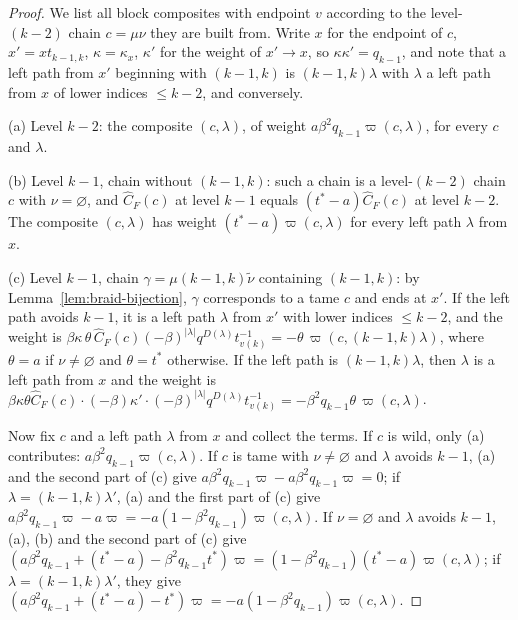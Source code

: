 \documentclass[11pt]{article}
\begin{document}
\begin{proof}
We list all block composites with endpoint $v$ according to the
level-$(k-2)$ chain $c=\mu\nu$ they are built from. Write $x$ for the
endpoint of $c$, $x'=xt_{k-1,k}$, $\kappa=\kappa_x$, $\kappa'$ for the
weight of $x'\to x$, so $\kappa\kappa'=q_{k-1}$, and note that a left
path from $x'$ beginning with $(k-1,k)$ is $(k-1,k)\lambda$ with
$\lambda$ a left path from $x$ of lower indices $\leq k-2$, and
conversely.

(a) Level $k-2$: the composite $(c,\lambda)$, of weight
$a\beta^2q_{k-1}\varpi(c,\lambda)$, for every $c$ and $\lambda$.

(b) Level $k-1$, chain without $(k-1,k)$: such a chain is a level-$(k-2)$
chain $c$ with $\nu=\varnothing$, and $\widehat C_F(c)$ at level $k-1$
equals $(t^\ast-a)\widehat C_F(c)$ at level $k-2$. The composite
$(c,\lambda)$ has weight $(t^\ast-a)\varpi(c,\lambda)$ for every left
path $\lambda$ from $x$.

(c) Level $k-1$, chain $\gamma=\mu(k-1,k)\tilde\nu$ containing
$(k-1,k)$: by Lemma~\ref{lem:braid-bijection}, $\gamma$ corresponds to
a tame $c$ and ends at $x'$. If the left path avoids $k-1$, it is a
left path $\lambda$ from $x'$ with lower indices $\leq k-2$, and the
weight is
$\beta\kappa\,\theta\,\widehat C_F(c)(-\beta)^{|\lambda|}q^{D(\lambda)}t^{-1}_{v(k)}
=-\theta\,\varpi(c,(k-1,k)\lambda)$, where $\theta=a$ if
$\nu\neq\varnothing$ and $\theta=t^\ast$ otherwise. If the left path is
$(k-1,k)\lambda$, then $\lambda$ is a left path from $x$ and the weight
is $\beta\kappa\theta\widehat C_F(c)\cdot(-\beta)\kappa'\cdot(-\beta)^{|\lambda|}q^{D(\lambda)}t^{-1}_{v(k)}
=-\beta^2q_{k-1}\theta\,\varpi(c,\lambda)$.

Now fix $c$ and a left path $\lambda$ from $x$ and collect the terms.
If $c$ is wild, only (a) contributes: $a\beta^2q_{k-1}\varpi(c,\lambda)$.
If $c$ is tame with $\nu\neq\varnothing$ and $\lambda$ avoids $k-1$,
(a) and the second part of (c) give
$a\beta^2q_{k-1}\varpi-a\beta^2q_{k-1}\varpi=0$; if $\lambda=(k-1,k)\lambda'$,
(a) and the first part of (c) give
$a\beta^2q_{k-1}\varpi-a\varpi=-a(1-\beta^2q_{k-1})\varpi(c,\lambda)$.
If $\nu=\varnothing$ and $\lambda$ avoids $k-1$, (a), (b) and the second
part of (c) give
$(a\beta^2q_{k-1}+(t^\ast-a)-\beta^2q_{k-1}t^\ast)\varpi
=(1-\beta^2q_{k-1})(t^\ast-a)\varpi(c,\lambda)$; if
$\lambda=(k-1,k)\lambda'$, they give
$(a\beta^2q_{k-1}+(t^\ast-a)-t^\ast)\varpi=-a(1-\beta^2q_{k-1})\varpi(c,\lambda)$.


\end{proof}
\end{document}
